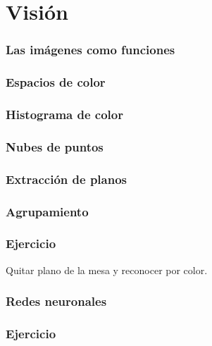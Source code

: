 \section{Visión}
\begin{frame}\frametitle{Las imágenes como funciones}
  
\end{frame}

\begin{frame}\frametitle{Espacios de color}
  
\end{frame}

\begin{frame}\frametitle{Histograma de color}
\end{frame}

\begin{frame}\frametitle{Nubes de puntos}
  
\end{frame}

\begin{frame}\frametitle{Extracción de planos}
  
\end{frame}


\begin{frame}\frametitle{Agrupamiento}
  
\end{frame}

\begin{frame}\frametitle{Ejercicio}
Quitar plano de la mesa y reconocer por color.   
\end{frame}

\begin{frame}\frametitle{Redes neuronales}
  
\end{frame}


\begin{frame}\frametitle{Ejercicio}
  
\end{frame}
